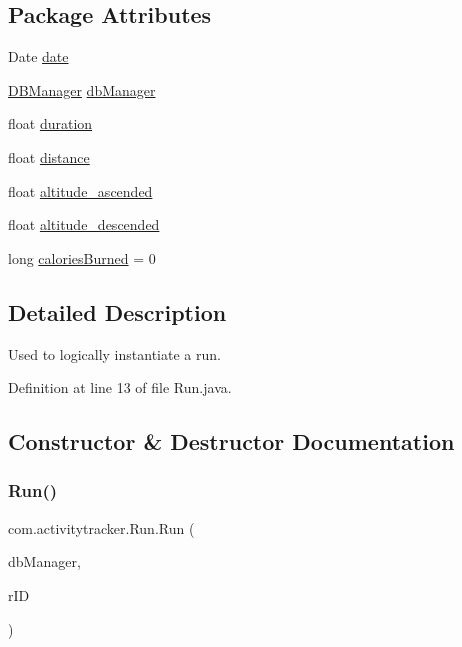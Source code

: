 \subsection*{Package Attributes}
\begin{DoxyCompactItemize}
\item 
Date \mbox{\hyperlink{classcom_1_1activitytracker_1_1_run_a66934b1f4fe6bc74a4e98574a2892764}{date}}
\item 
\mbox{\hyperlink{classcom_1_1activitytracker_1_1_d_b_manager}{D\+B\+Manager}} \mbox{\hyperlink{classcom_1_1activitytracker_1_1_run_ab90e32eda9f4c671ae3575f971edca6b}{db\+Manager}}
\item 
float \mbox{\hyperlink{classcom_1_1activitytracker_1_1_run_a5e38d293d29d4b65c9290ff4bee82e03}{duration}}
\item 
float \mbox{\hyperlink{classcom_1_1activitytracker_1_1_run_a7b4ca8c4ecea4da1653f03b8c8fc16a8}{distance}}
\item 
float \mbox{\hyperlink{classcom_1_1activitytracker_1_1_run_a247fe29ef5dceeb25750fc7c2701f5c8}{altitude\+\_\+ascended}}
\item 
float \mbox{\hyperlink{classcom_1_1activitytracker_1_1_run_a26cd078680ee374482ce848b90308dda}{altitude\+\_\+descended}}
\item 
long \mbox{\hyperlink{classcom_1_1activitytracker_1_1_run_aa4c73467653a47d3b14ff6653bbab853}{calories\+Burned}} = 0
\end{DoxyCompactItemize}


\subsection{Detailed Description}
Used to logically instantiate a run. 

Definition at line 13 of file Run.\+java.



\subsection{Constructor \& Destructor Documentation}
\mbox{\label{classcom_1_1activitytracker_1_1_run_a5568c1c514835056d2abc22cfba222c5}} 
\subsubsection{\texorpdfstring{Run()}{Run()}}
{\footnotesize\ttfamily com.\+activitytracker.\+Run.\+Run (\begin{DoxyParamCaption}\item[{final \mbox{\hyperlink{classcom_1_1activitytracker_1_1_d_b_manager}{D\+B\+Manager}}}]{db\+Manager,  }\item[{final int}]{r\+ID }\end{DoxyParamCaption})\hspace{0.3cm}{\ttfamily [package]}}

